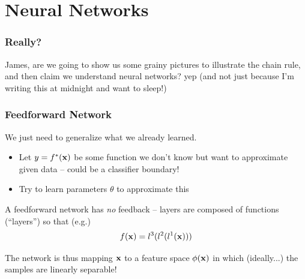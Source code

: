 \documentclass[10pt]{beamer}
\makeatletter
\newcommand*{\eg}{e.g.\@\xspace}
\makeatother
\begin{document}

\section{Neural Networks}

\begin{frame}
	\frametitle{Really?}
	James, are we going to show us some grainy pictures to illustrate the chain rule, and then claim we understand neural networks?
	\pause
	\vfill
	\alert{yep} (and not just because I'm writing this at midnight and want to sleep!)
\end{frame}

\begin{frame}
	\frametitle{Feedforward Network}
	We just need to generalize what we already learned.
	\begin{itemize}
		\item Let $y = f^*(\vb{x})$ be some function we don't know but want to approximate given data -- could be a classifier boundary!
		\item Try to learn parameters $\theta$ to approximate this
	\end{itemize}
	A feedforward network has \emph{no} feedback -- layers are composed of functions (``layers'') so that (\eg)
	\begin{equation}
		f (\vb{x}) = l^3(l^2(l^1(\vb{x})))
	\end{equation}
\end{frame}

\begin{frame}[standout]
  The network is thus mapping $\vb{x}$ to a feature space $\phi(\vb{x})$ in which (ideally...) the samples are linearly separable!
\end{frame}
\end{document}
